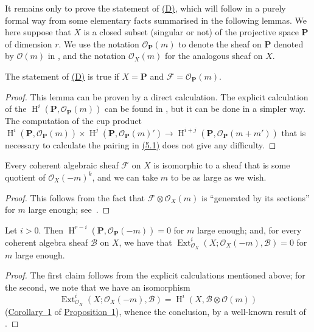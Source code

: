 \documentclass{article}
\theoremstyle{plain}
\newenvironment{lemma}[1]
  {\renewcommand\theinnerlemma{#1}\innerlemma}
  {\endinnerlemma}
\theoremstyle{definition}
\newcommand{\scr}[1]{{\mathscr{#1}}}
\newcommand{\bb}{\mathbf}
\DeclareMathOperator{\Ext}{Ext}
\DeclareMathOperator{\HH}{H}
\begin{document}
It remains only to prove the statement of \hyperref[(D)]{(D)}, which will follow in a purely formal way from some elementary facts summarised in the following lemmas.
We here suppose that $X$ is a closed subset (singular or not) of the projective space $\bb{P}$ of dimension $r$.
We use the notation $\scr{O}_\bb{P}(m)$ to denote the sheaf on $\bb{P}$ denoted by $\scr{O}(m)$ in \cite{3}, and the notation $\scr{O}_X(m)$ for the analogous sheaf on $X$.

\begin{lemma}{2}
\label{lemma2}
  The statement of \hyperref[(D)]{(D)} is true if $X=\bb{P}$ and $\scr{F}=\scr{O}_\bb{P}(m)$.
\end{lemma}

\begin{proof}
  This lemma can be proven by a direct calculation.
  The explicit calculation of the $\HH^i(\bb{P},\scr{O}_\bb{P}(m))$ can be found in \cite{3}, but it can be done in a simpler way.
  The computation of the cup product $\HH^i(\bb{P},\scr{O}_\bb{P}(m))\times\HH^j(\bb{P},\scr{O}_\bb{P}(m)') \to \HH^{i+j}(\bb{P},\scr{O}_\bb{P}(m+m'))$ that is necessary to calculate the pairing in \hyperref[5.1]{(5.1)} does not give any difficulty.
\end{proof}

\begin{lemma}{3}
\label{lemma3}
  Every coherent algebraic sheaf $\scr{F}$ on $X$ is isomorphic to a sheaf that is some quotient of $\scr{O}_X(-m)^k$, and we can take $m$ to be as large as we wish.
\end{lemma}

\begin{proof}
  This follows from the fact that $\scr{F}\otimes\scr{O}_X(m)$ is ``generated by its sections'' for $m$ large enough; see~\cite{3}.
\end{proof}

\begin{lemma}{4}
\label{lemma4}
  Let $i>0$.
  Then $\HH^{r-i}(\bb{P},\scr{O}_\bb{P}(-m))=0$ for $m$ large enough;
  and, for every coherent algebra sheaf $\scr{B}$ on $X$, we have that $\Ext_{\scr{O}_X}^i(X;\scr{O}_X(-m),\scr{B})=0$ for $m$ large enough.
\end{lemma}

\begin{proof}
  The first claim follows from the explicit calculations mentioned above;
  for the second, we note that we have an isomorphism
  \[
    \Ext_{\scr{O}_X}^i(X;\scr{O}_X(-m),\scr{B}) = \HH^i(X,\scr{B}\otimes\scr{O}(m))
  \]
  (\hyperref[proposition1corollary1]{Corollary~1} of \hyperref[proposition1]{Proposition~1}), whence the conclusion, by a well-known result of \cite{3}.
\end{proof}
\end{document}

